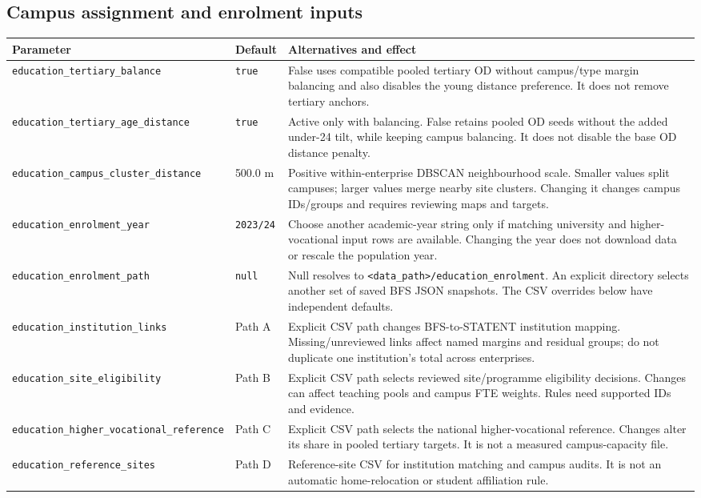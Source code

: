 \documentclass[11pt,a4paper]{article}
\newcommand{\code}[1]{\nolinkurl{#1}}
\begin{document}
\subsection{Campus assignment and enrolment inputs}
\small
\begin{longtable}{L{.34\textwidth}L{.13\textwidth}L{.45\textwidth}}
\toprule Parameter & Default & Alternatives and effect \\
\midrule\endhead
\code{education_tertiary_balance} & \code{true} & False uses compatible pooled
tertiary OD without campus/type margin balancing and also disables the young
distance preference. It does not remove tertiary anchors. \\
\code{education_tertiary_age_distance} & \code{true} & Active only with balancing.
False retains pooled OD seeds without the added under-24 tilt, while keeping
campus balancing. It does not disable the base OD distance penalty. \\
\code{education_campus_cluster_distance} & 500.0 m & Positive within-enterprise
DBSCAN neighbourhood scale. Smaller values split campuses; larger values merge
nearby site clusters. Changing it changes campus IDs/groups and requires reviewing maps and targets. \\
\code{education_enrolment_year} & \code{2023/24} & Choose another academic-year
string only if matching university and higher-vocational input rows are available.
Changing the year does not download data or rescale the population year. \\
\code{education_enrolment_path} & \code{null} & Null resolves to
\code{<data_path>/education_enrolment}. An explicit directory selects another
set of saved BFS JSON snapshots. The CSV overrides below have independent defaults. \\
\code{education_institution_links} & Path A & Explicit CSV path changes
BFS-to-STATENT institution mapping. Missing/unreviewed links affect named margins
and residual groups; do not duplicate one institution's total across enterprises. \\
\code{education_site_eligibility} & Path B & Explicit CSV path selects reviewed
site/programme eligibility decisions. Changes can affect teaching pools and
campus FTE weights. Rules need supported IDs and evidence. \\
\code{education_higher_vocational_reference} & Path C & Explicit CSV path selects
the national higher-vocational reference. Changes alter its share in pooled
tertiary targets. It is not a measured campus-capacity file. \\
\code{education_reference_sites} & Path D & Reference-site CSV for institution
matching and campus audits. It is not an automatic home-relocation or student
affiliation rule. \\
\bottomrule
\end{longtable}
\normalsize
\end{document}
